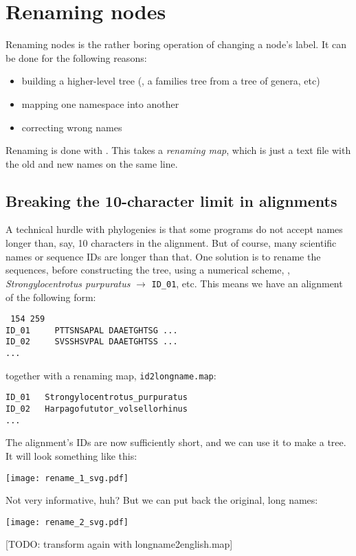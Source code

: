 \section{Renaming nodes}
\label{sct_rename}

Renaming nodes is the rather boring operation of changing a node's label. It
can be done \eg{} for the following reasons:
\begin{itemize}
	\item building a higher-level tree (\ie, a families tree from a tree of genera, etc)
	\item mapping one namespace into another
	\item correcting wrong names
\end{itemize}

Renaming is done with \rename. This takes a \emph{renaming map}, which is just
a text file with the old and new names on the same line.

\subsection{Breaking the 10-character limit in \phylip{} alignments}

A technical hurdle with phylogenies is that some programs do not accept names
longer than, say, 10 characters in the \phylip{} alignment. But of
course, many scientific names or sequence \textsc{ID}s are longer than that.
One solution is to rename the sequences, before constructing the tree, using a
numerical scheme, \eg{}, \textit{Strongylocentrotus purpuratus} $\rightarrow$
\texttt{ID\_01}, etc. This means we have an alignment of the following form:
\begin{verbatim}
 154 259
ID_01     PTTSNSAPAL DAAETGHTSG ...
ID_02     SVSSHSVPAL DAAETGHTSS ...
...
\end{verbatim}
together with a renaming map, \texttt{id2longname.map}:
\begin{verbatim}
ID_01	Strongylocentrotus_purpuratus
ID_02	Harpagofututor_volsellorhinus
...
\end{verbatim}
The alignment's \textsc{ID}s are now sufficiently short, and we can use it to
make a tree. It will look something like this:


\begin{center}
\texttt{[image: rename\_1\_svg.pdf]}
\end{center}

\noindent{}Not very informative, huh? But we can put back the original, long names:


\begin{center}
\texttt{[image: rename\_2\_svg.pdf]}
\end{center}

[TODO: transform again with longname2english.map]



